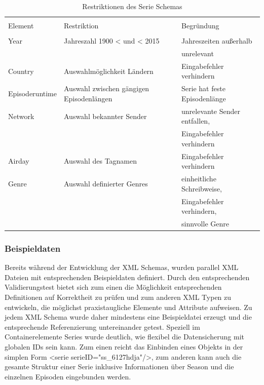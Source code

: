 \documentclass[a4paper]{article}
\begin{document}
\begin{table}[H]
\caption{Restriktionen des Serie Schemas}


\begin{tabular}{l l l}
\\ [-0.5ex]

\hline\hline
\\ [-0.5ex]
Element & Restriktion & Begründung
\\ [1.5ex]
\hline
\\ [-0.5ex]
Year & Jahreszahl 1900 < und < 2015 & Jahreszeiten außerhalb\\[1ex]
&&unrelevant \\[3ex]

Country & Auswahlmöglichkeit Ländern & Eingabefehler verhindern\\[3ex]
Episoderuntime & Auswahl zwischen gängigen Episodenlängen& Serie hat feste Episodenlänge\\[3ex]
Network & Auswahl bekannter Sender & unrelevante Sender entfallen,\\[3ex]
&&Eingabefehler verhindern\\[3ex]

Airday & Auswahl des Tagnamen & Eingabefehler verhindern\\[3ex]
Genre & Auswahl definierter Genres & einheitliche Schreibweise,\\[1ex]
&&Eingabefehler verhindern,\\[1ex]
&& sinnvolle Genre\\[2ex]

\hline
\end{tabular}
\label{tab:restriktionenderxsd}
\end{table}



\subsubsection{Beispieldaten}

Bereits während der Entwicklung der XML Schemas, wurden parallel XML Dateien mit entsprechenden Beispieldaten definiert. Durch den entsprechenden Validierungstest bietet sich zum einen die Möglichkeit entsprechenden Definitionen auf Korrektheit zu prüfen und zum anderen XML Typen zu entwickeln, die möglichst praxistaugliche Elemente und Attribute aufweisen. Zu jedem XML Schema wurde daher mindestens eine Beispieldatei erzeugt und die entsprechende Referenzierung untereinander getest. Speziell im Containerelemente Series wurde deutlich, wie flexibel die Datensicherung mit globalen IDs sein kann. Zum einen reicht das Einbinden eines Objekts in der simplen Form <serie serieID="ss\_6127hdja"/>, zum anderen kann auch die gesamte Struktur einer Serie inklusive Informationen über Season und die einzelnen Episoden eingebunden werden. \\
\end{document}
